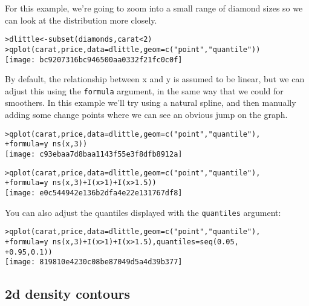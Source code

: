 For this example, we're going to zoom into a small range of diamond sizes so we can look at the distribution more closely.

\begin{alltt}
> dlittle <- subset(diamonds, carat < 2)
> qplot(carat, price, data = dlittle, geom = c("point", "quantile"))
\texttt{[image: bc9207316bc946500aa0332f21fc0c0f]}

\end{alltt}

By default, the relationship between x and y is assumed to be linear, but we can adjust this using the {\tt formula} argument, in the same way that we could for smoothers.  In this example we'll try using a natural spline, and then manually adding some change points where we can see an obvious jump on the graph.

\begin{alltt}
> qplot(carat, price, data = dlittle, geom = c("point", "quantile"), 
+     formula = y ~ ns(x, 3))
\texttt{[image: c93ebaa7d8baa1143f55e3f8dfb8912a]}

> qplot(carat, price, data = dlittle, geom = c("point", "quantile"), 
+     formula = y ~ ns(x, 3) + I(x > 1) + I(x > 1.5))
\texttt{[image: e0c544942e136b2dfa4e22e131767df8]}

\end{alltt}

You can also adjust the quantiles displayed with the {\tt quantiles} argument:

\begin{alltt}
> qplot(carat, price, data = dlittle, geom = c("point", "quantile"), 
+     formula = y ~ ns(x, 3) + I(x > 1) + I(x > 1.5), quantiles = seq(0.05, 
+         0.95, 0.1))
\texttt{[image: 819810e4230c08be87049d5a4d39b377]}

\end{alltt}

\subsection{2d density contours}


